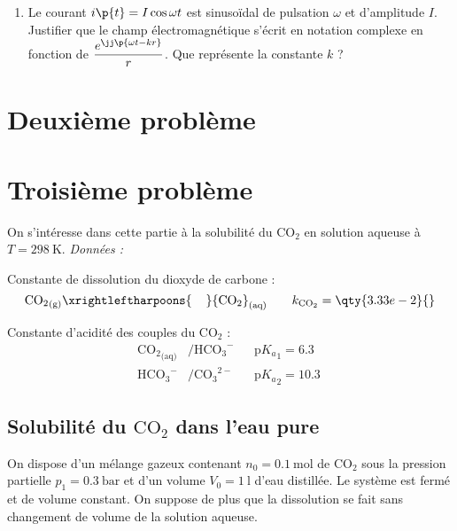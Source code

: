 \documentclass[a4paper,french,bookmarks]{article}
\begin{document}
    \begin{enumerate}
        \item Le courant $i\p{t} = I\cos{\omega t}$ est sinusoïdal de pulsation $\omega$ et d'amplitude $I$. Justifier que le champ électromagnétique s’écrit en notation complexe en fonction de $\dfrac{e^{\jj\p{\omega t - kr}}}{r}$. Que représente la constante $k$ ?
        
        
    \end{enumerate}
    
    
    
    \section{Deuxième problème}
    
    
    
    \newpage
    \section{Troisième problème}
    
    On s'intéresse dans cette partie à la solubilité du $\mathrm C \mathrm O_2$ en solution aqueuse à $T = \qty{298}{\kelvin}$. \emph{Données :}
    
    \begin{enumerate}
        \itt Constante de dissolution du dioxyde de carbone :
        \[  {\mathrm{CO}_2}_\text{(g)} \xrightleftharpoons{\hspace{0.4cm}} {\mathrm{CO}_2}_\text{(aq)} \qquad k_{\mathrm C\mathrm O_2} = \qty{3.33e-2}{} \]
        
        \itt Constante d'acidité des couples du ${\mathrm{CO}_2}$ :
        \begin{align*}
            {\mathrm C \mathrm O_2}_\text{(aq)} &/ \mathrm{HCO_3}^- && \mathrm p{K_a}_1 = \qty{6.3}{}\\
            \mathrm{HCO_3}^- &/ {\mathrm{CO}_3}^{2-} && \mathrm p{K_a}_2 = \qty{10.3}{}
        \end{align*}
    \end{enumerate}
    
    \subsection{Solubilité du $\mathrm C \mathrm O_2$ dans l'eau pure}
    
    On dispose d'un mélange gazeux contenant $n_0 = \qty{0.1}{\mol}$ de $\mathrm C \mathrm O_2$ sous la pression partielle $p_1 = \qty{0,3}{\bar}$ et d'un volume $V_0 = \qty{1}{\litre}$ d'eau distillée. Le système est fermé et de volume constant. On suppose de plus que la dissolution se fait sans changement de volume de la solution aqueuse.
    
\end{document}
